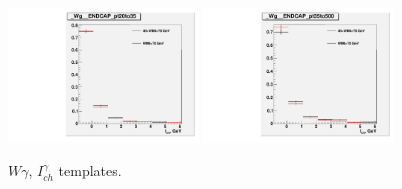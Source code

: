 \begin{figure}[htb]
\begin{center}
  \includegraphics[width=0.45\textwidth]{../figs/figs_v11/ChannelsMERGED_WGamma/QuickChecks/cTemplatesVsWMt_Wg_phoPFChIsoCorr_ENDCAP_pt20to35.pdf} \includegraphics[width=0.45\textwidth]{../figs/figs_v11/ChannelsMERGED_WGamma/QuickChecks/cTemplatesVsWMt_Wg_phoPFChIsoCorr_ENDCAP_pt35to500.pdf}\\
  \caption{$W\gamma$, $I_{ch}^{\gamma}$ templates.}
  \label{fig:templatesVsWMt_Wg_CHISO}
  \end{center}
\end{figure}

